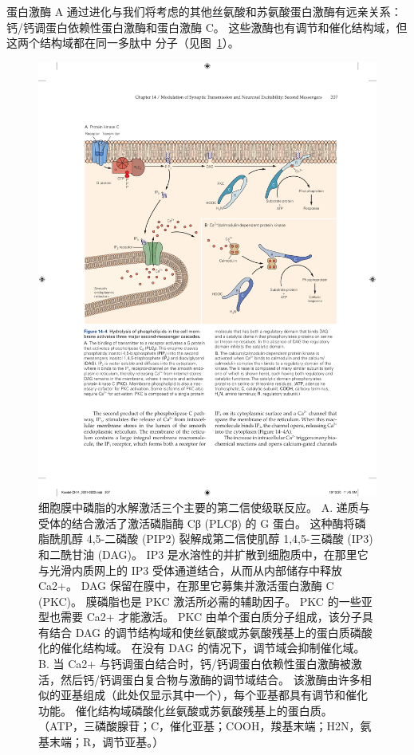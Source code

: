 蛋白激酶 A 通过进化与我们将考虑的其他丝氨酸和苏氨酸蛋白激酶有远亲关系：钙/钙调蛋白依赖性蛋白激酶和蛋白激酶 C。
这些激酶也有调节和催化结构域，但这两个结构域都在同一多肽中 分子（见图~\ref{fig:14_4}）。


\begin{figure}[htbp]
	\centering
	\includegraphics[width=0.95\linewidth]{chap14/fig_14_4}
	\caption{细胞膜中磷脂的水解激活三个主要的第二信使级联反应。 A. 递质与受体的结合激活了激活磷脂酶 Cβ (PLCβ) 的 G 蛋白。 这种酶将磷脂酰肌醇 4,5-二磷酸 (PIP2) 裂解成第二信使肌醇 1,4,5-三磷酸 (IP3) 和二酰甘油 (DAG)。 IP3 是水溶性的并扩散到细胞质中，在那里它与光滑内质网上的 IP3 受体通道结合，从而从内部储存中释放 Ca2+。 DAG 保留在膜中，在那里它募集并激活蛋白激酶 C (PKC)。 膜磷脂也是 PKC 激活所必需的辅助因子。 PKC 的一些亚型也需要 Ca2+ 才能激活。 PKC 由单个蛋白质分子组成，该分子具有结合 DAG 的调节结构域和使丝氨酸或苏氨酸残基上的蛋白质磷酸化的催化结构域。 在没有 DAG 的情况下，调节域会抑制催化域。 B. 当 Ca2+ 与钙调蛋白结合时，钙/钙调蛋白依赖性蛋白激酶被激活，然后钙/钙调蛋白复合物与激酶的调节域结合。 该激酶由许多相似的亚基组成（此处仅显示其中一个），每个亚基都具有调节和催化功能。 催化结构域磷酸化丝氨酸或苏氨酸残基上的蛋白质。 （ATP，三磷酸腺苷；C，催化亚基；COOH，羧基末端；H2N，氨基末端；R，调节亚基。）}
	\label{fig:14_4}
\end{figure}


